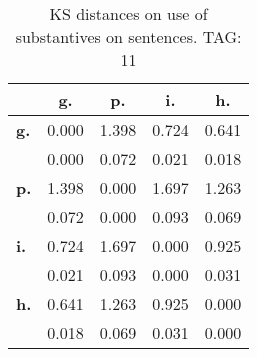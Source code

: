 \begin{table}[h!]
\begin{center}
\begin{tabular}{| l || c | c | c | c |}\hline
 & {\bf g.} & {\bf p.} & {\bf i.} & {\bf h.} \\\hline\hline
{\bf g.} & 0.000 & 1.398 & 0.724 & 0.641 \\
{\bf } & 0.000 & 0.072 & 0.021 & 0.018 \\\hline
{\bf p.} & 1.398 & 0.000 & 1.697 & 1.263 \\
{\bf } & 0.072 & 0.000 & 0.093 & 0.069 \\\hline
{\bf i.} & 0.724 & 1.697 & 0.000 & 0.925 \\
{\bf } & 0.021 & 0.093 & 0.000 & 0.031 \\\hline
{\bf h.} & 0.641 & 1.263 & 0.925 & 0.000 \\
{\bf } & 0.018 & 0.069 & 0.031 & 0.000 \\\hline
\end{tabular}
\caption{KS distances on use of substantives on sentences. TAG: 11}
\end{center}
\end{table}